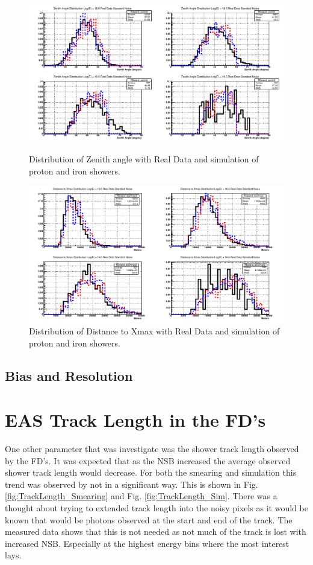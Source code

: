 \begin{figure}
\centering
\includegraphics[width=\textwidth]{chapters/graphs/SelectionEff/RealDataAndSim_ZenithDistComp.pdf}
\caption{Distribution of Zenith angle with Real Data and simulation of proton and iron showers.}
\vspace{3mm}
\includegraphics[width=\textwidth]{chapters/graphs/SelectionEff/RealDataAndSim_DistToXmaxDistComp.pdf}
\caption{Distribution of Distance to Xmax with Real Data and simulation of proton and iron showers.}
\end{figure}

\subsection{Bias and Resolution}

\section{EAS Track Length in the FD's}

One other parameter that was investigate was the shower track length observed by the FD's. It was expected that as the NSB increased the average observed shower track length would decrease. For both the smearing and simulation this trend was observed by not in a significant way. This is shown in Fig. \ref{fig:TrackLength_Smearing} and Fig. \ref{fig:TrackLength_Sim}.  There was a thought about trying to extended track length into the noisy pixels as it would be known that would be photons observed at the start and end of the track. The measured data shows that this is not needed as not much of the track is lost with increased NSB. Especially at the highest energy bins where the most interest lays. 

